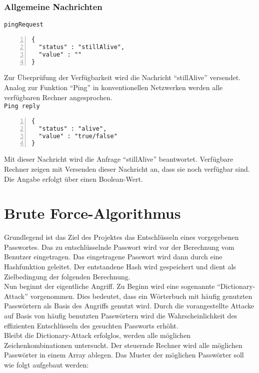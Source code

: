 \subsubsection{Allgemeine Nachrichten}

\texttt{pingRequest}
\begin{lstlisting}[basicstyle=\ttfamily,numbers=left,numberstyle=\footnotesize\ttfamily,backgroundcolor=\color{sourcegray}]
{
  "status" : "stillAlive",
  "value" : ""
}
\end{lstlisting}
Zur Überprüfung der Verfügbarkeit wird die Nachricht \enquote{stillAlive} versendet. Analog zur Funktion \enquote{Ping} in konventionellen Netzwerken werden alle verfügbaren Rechner angesprochen.  \\

\texttt{Ping reply}
\begin{lstlisting}[basicstyle=\ttfamily,numbers=left,numberstyle=\footnotesize\ttfamily,backgroundcolor=\color{sourcegray}]
{
  "status" : "alive",
  "value" : "true/false"
}
\end{lstlisting}
Mit dieser Nachricht wird die Anfrage \enquote{stillAlive} beantwortet. Verfügbare Rechner zeigen mit Versenden dieser Nachricht an, dass sie noch verfügbar sind. Die Angabe erfolgt über einen Boolean-Wert.\\

\section{Brute Force-Algorithmus}
\label{ideeBruteForce}
Grundlegend ist das Ziel des Projektes das Entschlüsseln eines vorgegebenen Passwortes. Das zu entschlüsselnde Passwort wird vor der Berechnung vom Benutzer eingetragen. Das eingetragene Passwort wird dann durch eine Hashfunktion geleitet. Der entstandene Hash wird gespeichert und dient als Zielbedingung der folgenden Berechnung. \\
Nun beginnt der eigentliche Angriff. Zu Beginn wird eine sogenannte \enquote{Dictionary-Attack} vorgenommen. Dies bedeutet, dass ein Wörterbuch mit häufig genutzten Passwörtern als Basis des Angriffs genutzt wird. Durch die vorangestellte Attacke auf Basis von häufig benutzten Passwörtern wird die Wahrscheinlichkeit des effizienten Entschlüsseln des gesuchten Passworts erhöht. \\
Bleibt die Dictionary-Attack erfolglos, werden alle möglichen Zeichenkombinationen untersucht. Der steuernde Rechner wird alle möglichen Passwörter in einem Array ablegen. Das Muster der möglichen Passwörter soll wie folgt aufgebaut werden: 

